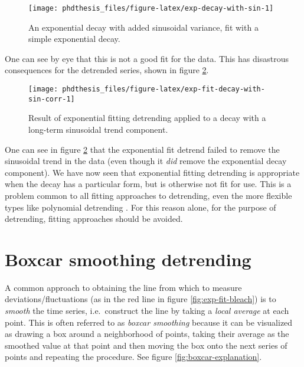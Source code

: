 \documentclass[12pt,]{book}
\theoremstyle{definition}
\theoremstyle{definition}
\theoremstyle{definition}
\theoremstyle{remark}
\begin{document}
\begin{figure}

\texttt{[image: phdthesis\_files/figure-latex/exp-decay-with-sin-1]} \hfill{}

\caption{An exponential decay with added
sinusoidal variance, fit with a simple exponential decay.}\label{fig:exp-decay-with-sin}
\end{figure}

One can see by eye that this is not a good fit for the data. This has
disastrous consequences for the detrended series, shown in figure
\ref{fig:exp-fit-decay-with-sin-corr}.





\begin{figure}

\texttt{[image: phdthesis\_files/figure-latex/exp-fit-decay-with-sin-corr-1]} \hfill{}

\caption{Result of exponential fitting
detrending applied to a decay with a long-term sinusoidal trend
component.}\label{fig:exp-fit-decay-with-sin-corr}
\end{figure}

One can see in figure \ref{fig:exp-fit-decay-with-sin-corr} that the
exponential fit detrend failed to remove the sinusoidal trend in the
data (even though it \emph{did} remove the exponential decay component).
We have now seen that exponential fitting detrending is appropriate when
the decay has a particular form, but is otherwise not fit for use. This
is a problem common to all fitting approaches to detrending, even the
more flexible types like polynomial detrending \citep{polynomial}. For
this reason alone, for the purpose of detrending, fitting approaches
should be avoided.

\section{Boxcar smoothing detrending}\label{boxcar-smoothing-detrending}

A common approach to obtaining the line from which to measure
deviations/fluctuations (as in the red line in figure
\ref{fig:exp-fit-bleach}) is to \emph{smooth} the time series,
i.e.~construct the line by taking a \emph{local average} at each point.
This is often referred to as \emph{boxcar smoothing} because it can be
visualized as drawing a box around a neighborhood of points, taking
their average as the smoothed value at that point and then moving the
box onto the next series of points and repeating the procedure. See
figure \ref{fig:boxcar-explanation}.
\end{document}
